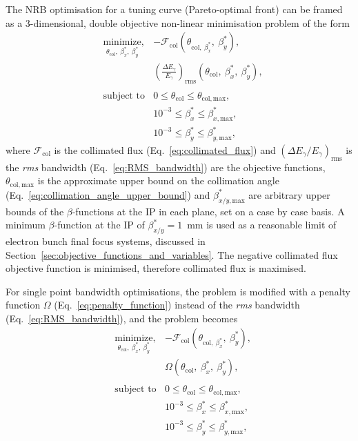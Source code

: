 \documentclass[../main.tex]{subfiles}
\begin{document}
The NRB optimisation for a tuning curve (Pareto-optimal front) can be framed as a 3-dimensional, double objective non-linear minimisation problem of the form
\begin{align}
&\underset{\theta_{\mathrm{col}},~\beta_{x}^{*},~\beta_{y}^{*}}{\text{minimize}}, &-\mathcal{F}_{\mathrm{col}}\left(\theta_{\mathrm{col},~\beta_{x}^{*}},~\beta_{y}^{*}\right), \nonumber\\ 
& &\left(\frac{\Delta E_{\gamma}}{E_{\gamma}}\right)_{\mathrm{rms}}\left(\theta_{\mathrm{col}},~\beta_{x}^{*},~\beta_{y}^{*}\right), \nonumber\\
\nonumber\\
&\text{subject to} &0 \leq \theta_{\mathrm{col}} \leq \theta_{\mathrm{col,max}}, \nonumber\\
& &10^{-3}\leq \beta_{x}^{*} \leq\beta_{x,\mathrm{max}}^{*}, \nonumber\\
& &10^{-3}\leq \beta_{y}^{*} \leq\beta_{y,\mathrm{max}}^{*},
\label{eq:NRB_tuning_curve_optimisation_definition}
\end{align}
where $\mathcal{F}_{\mathrm{col}}$ is the collimated flux (Eq.~\ref{eq:collimated_flux}) and $\left(\Delta E_{\gamma}/E_{\gamma}\right)_{\mathrm{rms}}$ is the \textit{rms} bandwidth (Eq.~\ref{eq:RMS_bandwidth}) are the objective functions, $\theta_{\mathrm{col},\mathrm{max}}$ is the approximate upper bound on the collimation angle (Eq.~\ref{eq:collimation_angle_upper_bound}) and $\beta_{x/y,\mathrm{max}}^{*}$ are arbitrary upper bounds of the $\beta$-functions at the IP in each plane, set on a case by case basis. A minimum $\beta$-function at the IP  of $\beta_{x/y}^{*}=1$~\si{\milli\meter} is used as a reasonable limit of electron bunch final focus systems, discussed in Section~\ref{sec:objective_functions_and_variables}. The negative collimated flux objective function is minimised, therefore collimated flux is maximised.

For single point bandwidth optimisations, the problem is modified with a penalty function $\Omega$ (Eq.~\ref{eq:penalty_function}) instead of the \textit{rms} bandwidth (Eq.~\ref{eq:RMS_bandwidth}), and the problem becomes 
\begin{align}
&\underset{\theta_{\mathrm{col}},~\beta_{x}^{*},~\beta_{y}^{*}}{\text{minimize}}, &-\mathcal{F}_{\mathrm{col}}\left(\theta_{\mathrm{col},~\beta_{x}^{*}},~\beta_{y}^{*}\right), \nonumber\\ 
& &\Omega\left(\theta_{\mathrm{col}},~\beta_{x}^{*},~\beta_{y}^{*}\right), \nonumber\\
\nonumber\\
&\text{subject to} &0 \leq \theta_{\mathrm{col}} \leq \theta_{\mathrm{col,max}}, \nonumber\\
& &10^{-3}\leq \beta_{x}^{*} \leq\beta_{x,\mathrm{max}}^{*}, \nonumber\\
& &10^{-3}\leq \beta_{y}^{*} \leq\beta_{y,\mathrm{max}}^{*},
\label{eq:NRB_single_point_optimisation_definition}
\end{align}
\end{document}
